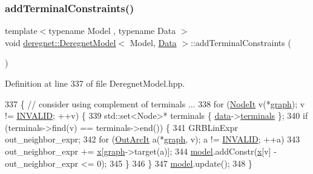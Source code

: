 \subsubsection{\texorpdfstring{add\+Terminal\+Constraints()}{addTerminalConstraints()}\hspace{0.1cm}{\footnotesize\ttfamily [1/2]}}
{\footnotesize\ttfamily template$<$typename Model , typename Data $>$ \\
void \hyperlink{classderegnet_1_1DeregnetModel}{deregnet\+::\+Deregnet\+Model}$<$ Model, \hyperlink{avgdrgnt_8cpp_a1d1235306db276e9b36acba1db1509e8}{Data} $>$\+::add\+Terminal\+Constraints (\begin{DoxyParamCaption}{ }\end{DoxyParamCaption})}



Definition at line 337 of file Deregnet\+Model.\+hpp.


\begin{DoxyCode}
337                                                         \{ \textcolor{comment}{// consider using complement of terminals ...}
338     \textcolor{keywordflow}{for} (\hyperlink{namespacederegnet_ac34314e1b5f456fc6d1bb9d96316de4a}{NodeIt} v(*\hyperlink{classderegnet_1_1DeregnetModel_a3cd2f54b8e061ef5bed32708d9bc1ef1}{graph}); v != \hyperlink{usinglemon_8hpp_adf770fe2eec438e3758ffe905dbae208}{INVALID}; ++v) \{
339         std::set<Node>* terminals \{ \hyperlink{classderegnet_1_1DeregnetModel_ad5399761cf6293a702f3800bda4806d1}{data}->\hyperlink{classderegnet_1_1DeregnetData_a1fe559c6056cd411647f836849e4b0da}{terminals} \};
340         \textcolor{keywordflow}{if} (terminals->find(v) == terminals->end()) \{
341             GRBLinExpr out\_neighbor\_expr;
342             \textcolor{keywordflow}{for} (\hyperlink{namespacederegnet_a253cef939ea250e4cc0c967cd0117853}{OutArcIt} a(*\hyperlink{classderegnet_1_1DeregnetModel_a3cd2f54b8e061ef5bed32708d9bc1ef1}{graph}, v); a != \hyperlink{usinglemon_8hpp_adf770fe2eec438e3758ffe905dbae208}{INVALID}; ++a)
343                 out\_neighbor\_expr += \hyperlink{classderegnet_1_1DeregnetModel_a360c980f3fec4dfbab50e9bb06a933a8}{x}[\hyperlink{classderegnet_1_1DeregnetModel_a3cd2f54b8e061ef5bed32708d9bc1ef1}{graph}->target(a)];
344             \hyperlink{classderegnet_1_1DeregnetModel_a30d525de2086e342b33fe3e45ede4947}{model}.addConstr(\hyperlink{classderegnet_1_1DeregnetModel_a360c980f3fec4dfbab50e9bb06a933a8}{x}[v] - out\_neighbor\_expr <= 0);
345         \}
346     \}
347     \hyperlink{classderegnet_1_1DeregnetModel_a30d525de2086e342b33fe3e45ede4947}{model}.update();
348 \}
\end{DoxyCode}
\mbox{\label{classderegnet_1_1DeregnetModel_acce4019d184420af47bbc9c38f06a33c}} 
